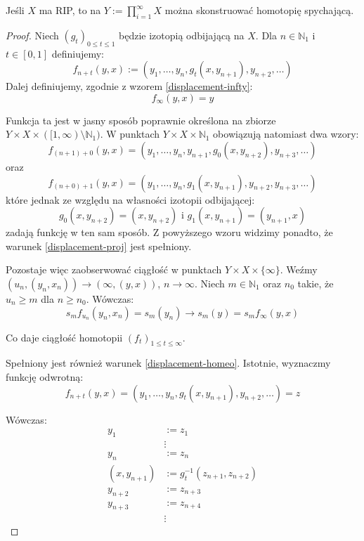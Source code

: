 \begin{thm}
  \label{thm:displacement-homotopy}
  Jeśli $X$ ma RIP, to na $Y := \prod_{i=1}^\infty X$ można skonstruować homotopię spychającą.
  \begin{proof}
    Niech $(g_t)_{0 \leq t \leq 1}$ będzie izotopią odbijającą na $X$. Dla $n \in \mathbb{N}_1$ i $t \in [0,1]$ definiujemy:
    \[f_{n+t}(y,x) := (y_1, \ldots, y_n, g_t(x, y_{n+1}), y_{n+2}, \ldots)\]
    Dalej definiujemy, zgodnie z wzorem \ref{displacement-infty}:
    \[f_\infty(y,x) = y\]
    
    Funkcja ta jest w jasny sposób poprawnie określona na zbiorze $Y \times X \times ([1, \infty) \setminus \mathbb{N}_1)$. W punktach $Y \times X \times \mathbb{N}_1$ obowiązują natomiast dwa wzory:
    \[f_{(n+1) + 0}(y,x) = (y_1, \ldots, y_n, y_{n+1}, g_0(x, y_{n+2}), y_{n+3}, \ldots)\]
    oraz
    \[f_{(n+0) + 1}(y,x) = (y_1, \ldots, y_n, g_1(x, y_{n+1}), y_{n+2}, y_{n+3}, \ldots)\]
    które jednak ze względu na własności izotopii odbijającej:
    \[g_0(x, y_{n+2}) = (x, y_{n+2}) \mbox{ i } g_1(x, y_{n+1}) = (y_{n+1}, x)\]
    zadają funkcję w ten sam sposób. Z powyższego wzoru widzimy ponadto, że warunek \ref{displacement-proj} jest spełniony.
    
    Pozostaje więc zaobserwować ciągłość w punktach $Y \times X \times \{\infty\}$. Weźmy $(u_n, (y_n, x_n)) \rightarrow (\infty, (y,x))$, $n \rightarrow \infty$. Niech $m \in \mathbb{N}_1$ oraz $n_0$ takie, że $u_n \geq m$ dla $n \geq n_0$. Wówczas:
    \[s_m f_{u_n}(y_n, x_n) = s_m(y_n) \rightarrow s_m(y) = s_m f_\infty (y,x)\]
    
    Co daje ciągłość homotopii $(f_t)_{1 \leq t \leq \infty}$.
    
    Spełniony jest również warunek \ref{displacement-homeo}. Istotnie, wyznaczmy funkcję odwrotną:
    \[f_{n+t}(y,x) = (y_1, \ldots, y_n, g_t(x, y_{n+1}), y_{n+2}, \ldots) = z\]
    
    Wówczas:
    \begin{align*}
      y_1 &:= z_1 \\
      & \vdots \\
      y_n &:= z_n \\
      (x, y_{n+1}) &:= g_t^{-1}(z_{n+1}, z_{n+2}) \\
      y_{n+2} &:= z_{n+3} \\
      y_{n+3} &:= z_{n+4} \\
      & \vdots
    \end{align*}


\end{proof}
\end{thm}
